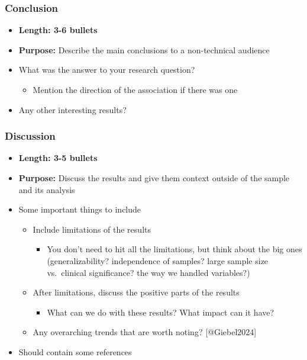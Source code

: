 \documentclass[
  letterpaper,
  DIV=11,
  numbers=noendperiod]{scrartcl}
\providecommand{\tightlist}{%
  \setlength{\itemsep}{0pt}\setlength{\parskip}{0pt}}\usepackage{longtable,booktabs,array}
\begin{document}
\subsubsection{Conclusion}\label{conclusion}

\begin{itemize}
\tightlist
\item
  \textbf{Length: 3-6 bullets}
\item
  \textbf{Purpose:} Describe the main conclusions to a non-technical
  audience
\item
  What was the answer to your research question?

  \begin{itemize}
  \tightlist
  \item
    Mention the direction of the association if there was one
  \end{itemize}
\item
  Any other interesting results?
\end{itemize}

\subsubsection{Discussion}\label{discussion}

\begin{itemize}
\tightlist
\item
  \textbf{Length: 3-5 bullets}
\item
  \textbf{Purpose:} Discuss the results and give them context outside of
  the sample and its analysis
\item
  Some important things to include

  \begin{itemize}
  \tightlist
  \item
    Include limitations of the results

    \begin{itemize}
    \tightlist
    \item
      You don't need to hit all the limitations, but think about the big
      ones (generalizability? independence of samples? large sample size
      vs.~clinical significance? the way we handled variables?)
    \end{itemize}
  \item
    After limitations, discuss the positive parts of the results

    \begin{itemize}
    \tightlist
    \item
      What can we do with these results? What impact can it have?
    \end{itemize}
  \item
    Any overarching trends that are worth noting? {[}@Giebel2024{]}
  \end{itemize}
\item
  Should contain some references
\end{itemize}
\end{document}
